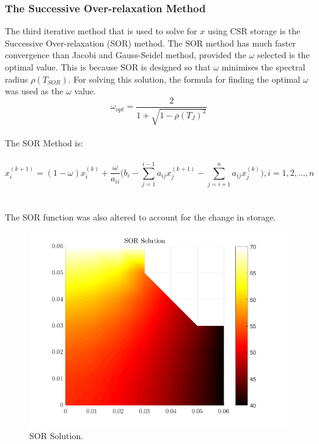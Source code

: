 \documentclass[12pt,a4paper]{article}
\begin{document}
\subsubsection{The Successive Over-relaxation Method}
The third iterative method that is used to solve for $x$ using CSR storage is the Successive Over-relaxation (SOR) method. The SOR method has much faster convergence than Jacobi and Gauss-Seidel method, provided the $\omega$ selected is the optimal value. This is because SOR is designed so that $\omega$ minimises the spectral radius $\rho(T_{SOR})$. For solving this solution, the formula for finding the optimal $\omega$ was used as the $\omega$ value.
$$\omega_{opt} = \frac{2}{1+\sqrt{1-\rho(T_{J})^{2}}}$$
\\
The SOR Method is: 
\\\\
$$x_{i}^{(k+1)} = (1-\omega)x_{i}^{(k)}+\frac{\omega}{a_{ii}}\bigg(b_i-\sum_{j=1}^{i-1}a_{ij}x_{j}^{(k+1)}-\sum_{j=i+1}^{n}a_{ij}x_{j}^{(k)}\bigg), i = 1, 2, ..., n$$
\\\\
The SOR function was also altered to account for the change in storage.

\begin{figure}[H]
	\includegraphics[width=\linewidth]{images/sorsolution.png}
	\caption{SOR Solution.}
	\label{fig:sor}
\end{figure}
\end{document}
